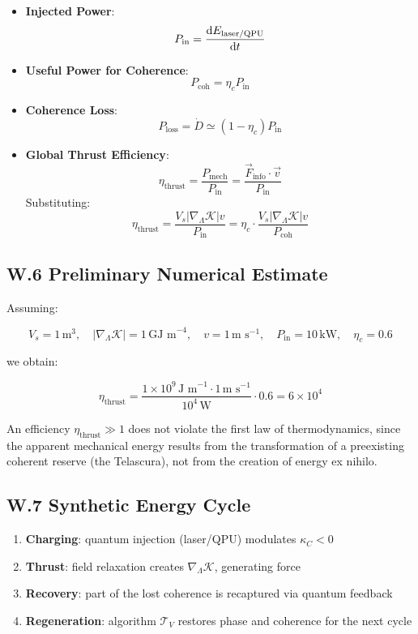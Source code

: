 \documentclass[12pt]{article}
\begin{document}
\begin{itemize}
  \item \textbf{Injected Power}:
  \[
  P_{\text{in}} = \dv{E_{\text{laser/QPU}}}{t}
  \]

  \item \textbf{Useful Power for Coherence}:
  \[
  P_{\text{coh}} = \eta_c P_{\text{in}}
  \]

  \item \textbf{Coherence Loss}:
  \[
  P_{\text{loss}} = \dot{D} \simeq (1 - \eta_c) P_{\text{in}}
  \]

  \item \textbf{Global Thrust Efficiency}:
  \[
  \eta_{\text{thrust}} = \frac{P_{\text{mech}}}{P_{\text{in}}} = \frac{\vec{F}_{\text{info}} \cdot \vec{v}}{P_{\text{in}}}
  \]
  Substituting:
  \[
  \eta_{\text{thrust}} = \frac{V_s |\nabla_\Lambda \mathcal{K}| v}{P_{\text{in}}} = \eta_c \cdot \frac{V_s |\nabla_\Lambda \mathcal{K}| v}{P_{\text{coh}}}
  \]
\end{itemize}

\subsection*{W.6 Preliminary Numerical Estimate}

Assuming:

\[
V_s = 1\, \text{m}^3, \quad
|\nabla_\Lambda \mathcal{K}| = 1\, \text{GJ m}^{-4}, \quad
v = 1\, \text{m s}^{-1}, \quad
P_{\text{in}} = 10\, \text{kW}, \quad
\eta_c = 0.6
\]

we obtain:

\[
\eta_{\text{thrust}} = \frac{1 \times 10^9\, \text{J m}^{-1} \cdot 1\, \text{m s}^{-1}}{10^4\, \text{W}} \cdot 0.6 = 6 \times 10^4
\]

An efficiency $\eta_{\text{thrust}} \gg 1$ does not violate the first law of thermodynamics, since the apparent mechanical energy results from the transformation of a preexisting coherent reserve (the Telascura), not from the creation of energy ex nihilo.

\subsection*{W.7 Synthetic Energy Cycle}

\begin{enumerate}
    \item \textbf{Charging}: quantum injection (laser/QPU) modulates $\kappa_C < 0$
    \item \textbf{Thrust}: field relaxation creates $\nabla_\Lambda \mathcal{K}$, generating force
    \item \textbf{Recovery}: part of the lost coherence is recaptured via quantum feedback
    \item \textbf{Regeneration}: algorithm $\mathcal{T}_V$ restores phase and coherence for the next cycle
\end{enumerate}
\end{document}

